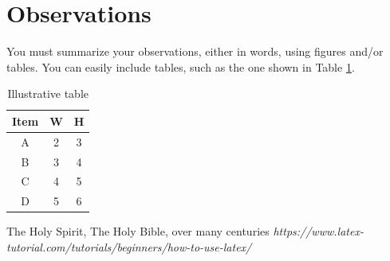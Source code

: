 \documentclass[12pt]{article}
\begin{document}
\section{Observations}

You must summarize your observations, either in words, using
figures and/or tables.
%
%
You can easily include tables, such as the one shown in  Table \ref{table:demotable}.
\begin{table}
\centering  %
\begin{tabular}{|c | c c|} %
\hline  %
Item & W & H \\  %
\hline  %
A    & 2 & 3 \\  %
B    & 3 & 4 \\  %
C    & 4 & 5 \\  %
D    & 5 & 6 \\  %
\hline	%
\end{tabular}
\caption{Illustrative table}
\label{table:demotable}
\end{table}


%
% 
\begin{thebibliography}{99}
The Holy Spirit, The Holy Bible, over many centuries
%
%
{\em https://www.latex-tutorial.com/tutorials/beginners/how-to-use-latex/}

\end{thebibliography}
\end{document}
